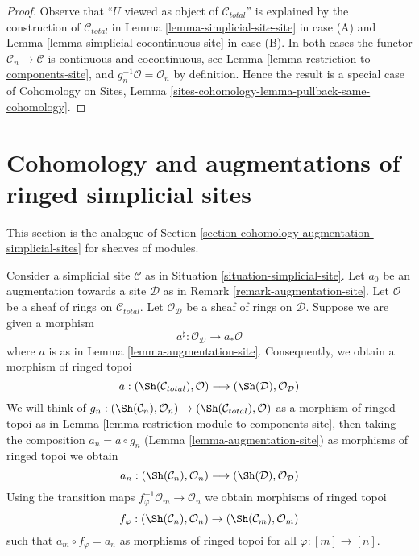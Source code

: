 \begin{proof}
Observe that ``$U$ viewed as object of $\mathcal{C}_{total}$''
is explained by the construction of $\mathcal{C}_{total}$ in
Lemma \ref{lemma-simplicial-site-site} in case (A) and
Lemma \ref{lemma-simplicial-cocontinuous-site} in case (B).
In both cases the functor $\mathcal{C}_n \to \mathcal{C}$
is continuous and cocontinuous, see
Lemma \ref{lemma-restriction-to-components-site}, and
$g_n^{-1}\mathcal{O} = \mathcal{O}_n$ by definition.
Hence the result is a special case of
Cohomology on Sites, Lemma
\ref{sites-cohomology-lemma-pullback-same-cohomology}.
\end{proof}






\section{Cohomology and augmentations of ringed simplicial sites}
\label{section-cohomology-augmentation-ringed-simplicial-sites}

\noindent
This section is the analogue of
Section \ref{section-cohomology-augmentation-simplicial-sites}
for sheaves of modules.

\medskip\noindent
Consider a simplicial site $\mathcal{C}$ as in
Situation \ref{situation-simplicial-site}.
Let $a_0$ be an augmentation towards a site $\mathcal{D}$ as in
Remark \ref{remark-augmentation-site}.
Let $\mathcal{O}$ be a sheaf of rings on $\mathcal{C}_{total}$.
Let $\mathcal{O}_\mathcal{D}$ be a sheaf of rings on $\mathcal{D}$.
Suppose we are given a morphism
$$
a^\sharp : \mathcal{O}_\mathcal{D} \longrightarrow a_*\mathcal{O}
$$
where $a$ is as in Lemma \ref{lemma-augmentation-site}.
Consequently, we obtain a morphism of ringed topoi
$$
a :
(\Sh(\mathcal{C}_{total}), \mathcal{O})
\longrightarrow
(\Sh(\mathcal{D}), \mathcal{O}_\mathcal{D})
$$
We will think of $g_n : (\Sh(\mathcal{C}_n), \mathcal{O}_n) \to
(\Sh(\mathcal{C}_{total}), \mathcal{O})$ as a morphism of ringed topoi
as in
Lemma \ref{lemma-restriction-module-to-components-site}, then
taking the composition $a_n = a \circ g_n$
(Lemma \ref{lemma-augmentation-site})
as morphisms of ringed topoi we obtain
$$
a_n :
(\Sh(\mathcal{C}_n), \mathcal{O}_n)
\longrightarrow
(\Sh(\mathcal{D}), \mathcal{O}_\mathcal{D})
$$
Using the transition maps $f_\varphi^{-1}\mathcal{O}_m \to \mathcal{O}_n$
we obtain morphisms of ringed topoi
$$
f_\varphi : (\Sh(\mathcal{C}_n), \mathcal{O}_n) \to
(\Sh(\mathcal{C}_m), \mathcal{O}_m)
$$
such that $a_m \circ f_\varphi = a_n$ as morphisms of
ringed topoi for all $\varphi : [m] \to [n]$.

